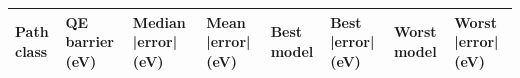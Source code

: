 \begin{tabular}{llllllll}
\toprule
Path class & QE barrier (eV) & Median |error| (eV) & Mean |error| (eV) & Best model & Best |error| (eV) & Worst model & Worst |error| (eV) \\
\midrule
\bottomrule
\end{tabular}
